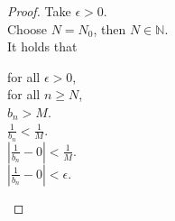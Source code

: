 \documentclass{article}
\newcommand{\N}{\mathbb{N}}
\newcommand{\e}{\epsilon}
\theoremstyle{mytheoremstyle}
\theoremstyle{mytheoremstyle}
\theoremstyle{myproblemstyle}
\begin{document}
\begin{proof}
        Take $\e > 0$. \\
        Choose $N = N_0$, then $N \in \N$. \\
        It holds that
        \begin{center}
            \parbox{\linewidth}{
                \linewidth
                for all $\e > 0$, \\
                \hspace*{1em} for all $n \geq N$, \\
                \hspace*{2em} $b_n > M$. \\
                \hspace*{3em} $\frac{1}{b_n} < \frac{1}{M}$. \\
                \hspace*{4em} $|\frac{1}{b_n} - 0| < \frac{1}{M}$. \\
                \hspace*{5em} $|\frac{1}{b_n} - 0| < \e$.
            }
        \end{center}


\end{proof}
\end{document}
